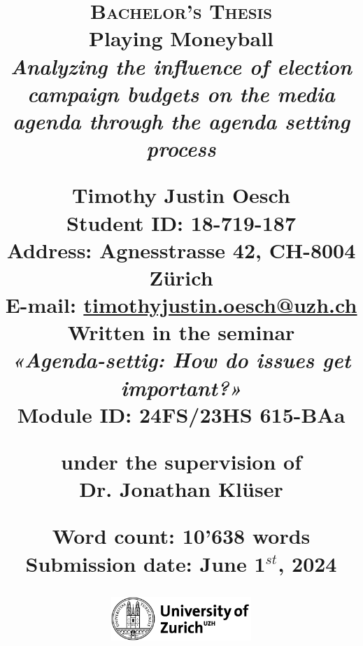 \begin{titlepage}
\title{
    \raggedright
    \small
    \textsc{Bachelor's Thesis} \\
    \vspace{0.5cm}
    \fontsize{32pt}{32pt}
    \textbf{Playing Moneyball}\\
    \vspace{0.2cm}
    \Large\textit{Analyzing the influence of election campaign budgets on the media agenda through the agenda setting process} \\
    
    \vspace{1cm}

    \textbf{Timothy Justin Oesch }\\
    \vspace{0.25cm}
    \normalsize
    \textbf{Student ID:} 18-719-187\\
    \textbf{Address:} Agnesstrasse 42, CH-8004 Zürich\\
    \textbf{E-mail:} \href{mailto:timothyjustin.oesch@uzh.ch}{\underline{timothyjustin.oesch@uzh.ch}}\\
    
    \vspace{0.5cm} 
    Written in the seminar\\
    \textit{«Agenda-settig: How do issues get important?»}\\
    Module ID: 24FS/23HS 615-BAa
    
    \vspace{0.5cm}
    under the supervision of\\
    \textbf{Dr. Jonathan Klüser}

    
    
    \vspace{0.25cm}
    \scriptsize{
        Word count: 10'638 words \\
        Submission date: June 1$^{st}$, 2024
    } \\
    
    \date{}
    \begin{figure}[b]
        \centering
        \includegraphics[width=200px]{LaTeX/partials/01.1_uzh_logo.png}
    \end{figure}
}
\clearpage\maketitle
\thispagestyle{empty}
\end{titlepage}